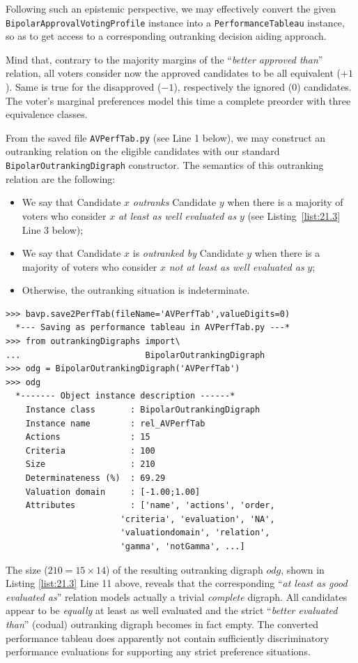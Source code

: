 Following such an epistemic perspective, we may effectively convert the given \texttt{BipolarApprovalVotingProfile} instance into a \texttt{PerformanceTableau} instance, so as to get access to a corresponding outranking decision aiding approach.

Mind that, contrary to the majority margins of the ``\emph{better approved than}'' relation, all voters consider now the approved candidates to be all equivalent ($+1$). Same is true for the disapproved ($-1$), respectively the ignored ($0$) candidates. The voter's marginal preferences model this time a complete preorder with three equivalence classes. 

From the saved file \texttt{AVPerfTab.py} (see Line 1 below), we may construct an outranking relation on the eligible candidates with our standard \texttt{BipolarOutrankingDigraph} constructor. The semantics of this outranking relation are the following:
\begin{itemize}[nosep,leftmargin=0.5cm,rightmargin=0.5cm]
\item We say that Candidate $x$ \emph{outranks} Candidate $y$ when there is a majority of voters who consider $x$ \emph{at least as well evaluated as} $y$ (see Listing~\ref{list:21.3} Line 3 below);
\item We say that Candidate $x$ is \emph{outranked by} Candidate $y$ when there is a majority of voters who consider $x$ \emph{not at least as well evaluated as} $y$;
\item Otherwise, the outranking situation is indeterminate.
\end{itemize}
\begin{lstlisting}[caption={Computing the outranking digraph},label=list:21.3]
>>> bavp.save2PerfTab(fileName='AVPerfTab',valueDigits=0)
  *--- Saving as performance tableau in AVPerfTab.py ---*
>>> from outrankingDigraphs import\
...                         BipolarOutrankingDigraph
>>> odg = BipolarOutrankingDigraph('AVPerfTab')
>>> odg
  *------- Object instance description ------*
    Instance class       : BipolarOutrankingDigraph
    Instance name        : rel_AVPerfTab
    Actions              : 15
    Criteria             : 100
    Size                 : 210
    Determinateness (%)  : 69.29
    Valuation domain     : [-1.00;1.00]
    Attributes           : ['name', 'actions', 'order,
                       'criteria', 'evaluation', 'NA',
                       'valuationdomain', 'relation',
                       'gamma', 'notGamma', ...]
\end{lstlisting}
The size ($210 = 15 \times 14$) of the resulting outranking digraph $odg$, shown in Listing \ref{list:21.3} Line 11 above, reveals that the corresponding ``\emph{at least as good evaluated as}'' relation models actually a trivial \emph{complete} digraph. All candidates appear to be \emph{equally} at least as well evaluated and the strict ``\emph{better evaluated than}'' (codual) outranking digraph becomes in fact empty. The converted performance tableau does apparently not contain sufficiently discriminatory performance evaluations for supporting any strict preference situations.


